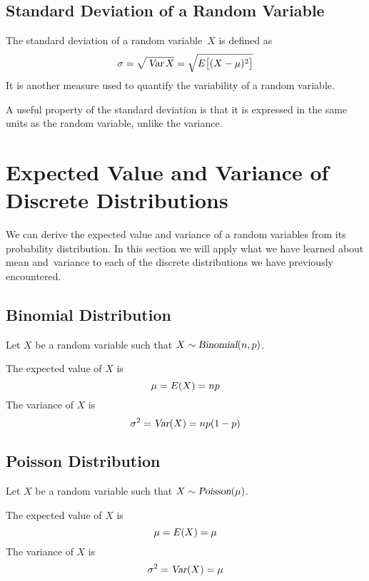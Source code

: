 \subsection{Standard Deviation of a Random Variable}
The standard deviation of a random variable~$X$ is defined as
\[
    \sigma = \sqrt{\mathstrut\operatorname{\textsl{Var}} X} 
    = \sqrt{\mathstrut E\bigl[(X - \mu)^2\bigr]}
\]
It is another measure used to quantify the variability of a random variable.
\begin{info}
A useful property of the standard deviation is that it is expressed in the same units as the random variable, unlike the variance.
\end{info}

\section{Expected Value and Variance of Discrete Distributions}
We can derive the expected value and variance of a random variables from its probability distribution. In this section we will apply what we have learned about mean and~variance to each of the discrete distributions we have previously encountered.
\subsection*{Binomial Distribution}
Let $X$ be a random variable such that $X \sim \operatorname{\textsl{Binomial}}(n,p)$.
\par\medskip\noindent
The expected value of $X$ is
\[
    \mu = E(X) = np
\]
The variance of $X$ is
\[
    \sigma^2 = \operatorname{\textsl{Var}}(X) = np(1-p)
\]
\subsection*{Poisson Distribution}
Let $X$ be a random variable such that $X \sim \operatorname{\textsl{Poisson}}(\mu)$.
\par\medskip\noindent
The expected value of $X$ is
\[
    \mu = E(X) = \mu
\]
The variance of $X$ is
\[
    \sigma^2 = \operatorname{\textsl{Var}}(X) = \mu
\]
